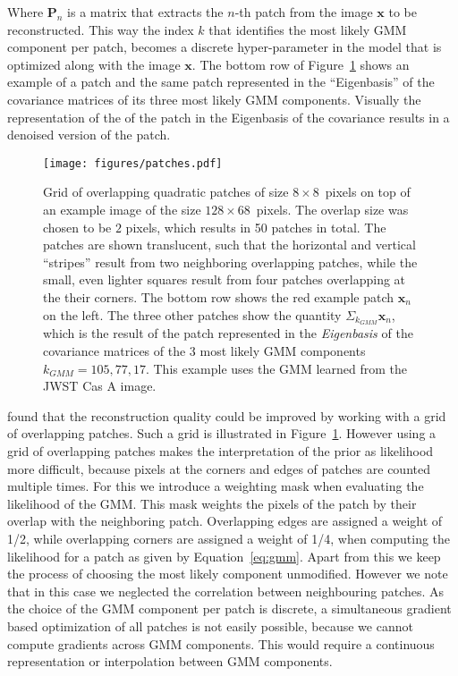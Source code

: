 \documentclass[twocolumn]{aastex631}
\begin{document}
    Where $\mathbf{P}_n$ is a matrix that extracts the $n$-th patch from the image $\mathbf{x}$ to be reconstructed. This way the index $k$ that identifies the most likely GMM component per patch, becomes a discrete hyper-parameter in the model that is optimized along with the image $\mathbf{x}$. The bottom row of Figure~\ref{fig:patches} shows an example of a patch and the same patch represented in the \enquote{Eigenbasis} of the covariance matrices of its three most likely GMM components. Visually the representation of the of the patch in the Eigenbasis of the covariance results in a denoised version of the patch.
    
 \begin{figure}
        \begin{centering}
            \texttt{[image: figures/patches.pdf]}
            \caption{
                Grid of overlapping quadratic patches of size $8\times8$~pixels on top of an example image of the size $128 \times 68$~pixels. The overlap size was chosen to be $2$ pixels, which results in 50 patches in total. The patches are shown translucent, such that the horizontal and vertical \enquote{stripes} result from two neighboring overlapping patches, while the small, even lighter squares result from four patches overlapping at the their corners. The bottom row shows the red example patch $\mathbf{x}_n$ on the left. The three other patches show the quantity $\Sigma_{k_{GMM}} \mathbf{x}_n$, which is the result of the patch represented in the \textit{Eigenbasis} of the covariance matrices of the 3 most likely GMM components $k_{GMM} = 105, 77, 17$. This example uses the GMM learned from the JWST Cas A image.
            }
            \label{fig:patches}
        \end{centering}
    \end{figure}


    \cite{Zoran2011} found that the reconstruction quality could be improved by working with a grid of overlapping patches. Such a grid is illustrated in Figure~\ref{fig:patches}. However using a grid of overlapping patches makes the interpretation of the prior as likelihood more difficult, because pixels at the corners and edges of patches are counted multiple times. For this we introduce a weighting mask when evaluating the likelihood of the GMM. This mask weights the pixels of the patch by their overlap with the neighboring patch. Overlapping edges are assigned a weight of 1/2, while overlapping corners are assigned a weight of 1/4, when computing the likelihood for a patch as given by  Equation~\ref{eq:gmm}. Apart from this we keep the process of choosing the most likely component unmodified. However we note that in this case we neglected the correlation between neighbouring patches. As the choice of the GMM component per patch is discrete, a simultaneous gradient based optimization of all patches is not easily possible, because we cannot compute gradients across GMM components. This would require a continuous representation or interpolation between GMM components.
   
\end{document}
